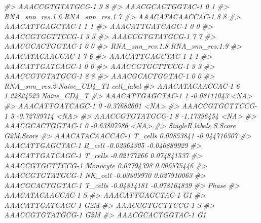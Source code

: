 \documentclass[
]{book}
\newenvironment{Shaded}{\begin{snugshade}}{\end{snugshade}}
\newcommand{\CommentTok}[1]{\textcolor[rgb]{0.56,0.35,0.01}{\textit{#1}}}
\begin{document}
\begin{Shaded}
\begin{Highlighting}[]
\CommentTok{\#\textgreater{} AAACCGTGTATGCG{-}1               9               8}
\CommentTok{\#\textgreater{} AAACGCACTGGTAC{-}1               0               1}
\CommentTok{\#\textgreater{}                  RNA\_snn\_res.1.6 RNA\_snn\_res.1.7}
\CommentTok{\#\textgreater{} AAACATACAACCAC{-}1               8               8}
\CommentTok{\#\textgreater{} AAACATTGAGCTAC{-}1               1               1}
\CommentTok{\#\textgreater{} AAACATTGATCAGC{-}1               0               0}
\CommentTok{\#\textgreater{} AAACCGTGCTTCCG{-}1               3               3}
\CommentTok{\#\textgreater{} AAACCGTGTATGCG{-}1               7               7}
\CommentTok{\#\textgreater{} AAACGCACTGGTAC{-}1               0               0}
\CommentTok{\#\textgreater{}                  RNA\_snn\_res.1.8 RNA\_snn\_res.1.9}
\CommentTok{\#\textgreater{} AAACATACAACCAC{-}1               7               6}
\CommentTok{\#\textgreater{} AAACATTGAGCTAC{-}1               1               1}
\CommentTok{\#\textgreater{} AAACATTGATCAGC{-}1               0               0}
\CommentTok{\#\textgreater{} AAACCGTGCTTCCG{-}1               3               3}
\CommentTok{\#\textgreater{} AAACCGTGTATGCG{-}1               8               8}
\CommentTok{\#\textgreater{} AAACGCACTGGTAC{-}1               0               0}
\CommentTok{\#\textgreater{}                  RNA\_snn\_res.2 Naive\_CD4\_T1  cell\_label}
\CommentTok{\#\textgreater{} AAACATACAACCAC{-}1             6   1.22824523 Naive\_CD4\_T}
\CommentTok{\#\textgreater{} AAACATTGAGCTAC{-}1             1  {-}0.08111043        \textless{}NA\textgreater{}}
\CommentTok{\#\textgreater{} AAACATTGATCAGC{-}1             0  {-}0.37682601        \textless{}NA\textgreater{}}
\CommentTok{\#\textgreater{} AAACCGTGCTTCCG{-}1             5  {-}0.72739714        \textless{}NA\textgreater{}}
\CommentTok{\#\textgreater{} AAACCGTGTATGCG{-}1             8  {-}1.17396454        \textless{}NA\textgreater{}}
\CommentTok{\#\textgreater{} AAACGCACTGGTAC{-}1             0  {-}0.63807586        \textless{}NA\textgreater{}}
\CommentTok{\#\textgreater{}                  SingleR.labels     S.Score    G2M.Score}
\CommentTok{\#\textgreater{} AAACATACAACCAC{-}1        T\_cells  0.09853841 {-}0.044716507}
\CommentTok{\#\textgreater{} AAACATTGAGCTAC{-}1         B\_cell {-}0.02364305 {-}0.046889929}
\CommentTok{\#\textgreater{} AAACATTGATCAGC{-}1        T\_cells {-}0.02177266  0.074841537}
\CommentTok{\#\textgreater{} AAACCGTGCTTCCG{-}1       Monocyte  0.03794398  0.006575446}
\CommentTok{\#\textgreater{} AAACCGTGTATGCG{-}1        NK\_cell {-}0.03309970  0.027910063}
\CommentTok{\#\textgreater{} AAACGCACTGGTAC{-}1        T\_cells {-}0.04814181 {-}0.078164839}
\CommentTok{\#\textgreater{}                  Phase}
\CommentTok{\#\textgreater{} AAACATACAACCAC{-}1     S}
\CommentTok{\#\textgreater{} AAACATTGAGCTAC{-}1    G1}
\CommentTok{\#\textgreater{} AAACATTGATCAGC{-}1   G2M}
\CommentTok{\#\textgreater{} AAACCGTGCTTCCG{-}1     S}
\CommentTok{\#\textgreater{} AAACCGTGTATGCG{-}1   G2M}
\CommentTok{\#\textgreater{} AAACGCACTGGTAC{-}1    G1}
\end{Highlighting}
\end{Shaded}
\end{document}
